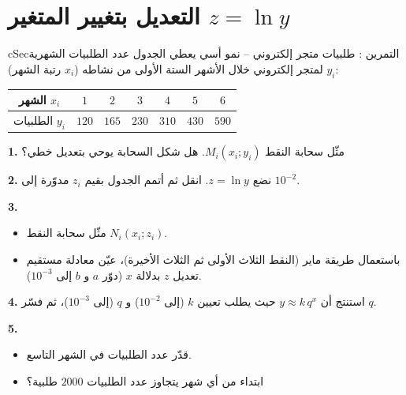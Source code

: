 \documentclass[12pt,a4paper]{article}
\newenvironment{BOX}[2]{\begin{otherlanguage}{english}\begin{arbox}{#1}{#2}}{\end{arbox}\end{otherlanguage}}
\newcounter{exo}
\newenvironment{tamrin}[1]{\stepcounter{exo}\begin{BOX}{cSec}{التمرين \theexo: #1}}{\end{BOX}}
\newenvironment{LTR}{\begin{otherlanguage}{english}}{\end{otherlanguage}}
\newcommand{\ar}[1]{\foreignlanguage{arabic}{#1}}
\newenvironment{sq}{\begin{itemize}[leftmargin=2.4em,itemsep=3pt]}{\end{itemize}}
\newcommand{\qa}{\item[(أ)]}\newcommand{\qb}{\item[(ب)]}\newcommand{\qc}{\item[(جـ)]}\newcommand{\qd}{\item[(د)]}\newcommand{\qe}{\item[(هـ)]}
\newcommand{\QQ}[1]{\par\smallskip\textbf{#1.} }
\begin{document}
\section{التعديل بتغيير المتغير $z=\ln y$}
\begin{tamrin}{طلبيات متجر إلكتروني -- نمو أسي}
يعطي الجدول عدد الطلبيات الشهرية $y_i$ لمتجر إلكتروني خلال الأشهر الستة الأولى من نشاطه ($x_i$ رتبة الشهر):
\begin{center}\begin{LTR}\renewcommand{\arraystretch}{1.35}\small
\begin{tabular}{|c|c|c|c|c|c|c|}\hline
\rowcolor{cSec!12}\ar{الشهر} $x_i$ & $1$ & $2$ & $3$ & $4$ & $5$ & $6$\\\hline
\ar{الطلبيات} $y_i$ & $120$ & $165$ & $230$ & $310$ & $430$ & $590$\\\hline
\end{tabular}\end{LTR}\end{center}
\QQ{1} مثّل سحابة النقط $M_i(x_i;y_i)$. هل شكل السحابة يوحي بتعديل خطي؟
\QQ{2} نضع $z=\ln y$. انقل ثم أتمم الجدول بقيم $z_i$ مدوّرة إلى $10^{-2}$.
\QQ{3}
\begin{sq}
\qa مثّل سحابة النقط $N_i(x_i;z_i)$.
\qb باستعمال طريقة ماير (النقط الثلاث الأولى ثم الثلاث الأخيرة)، عيّن معادلة مستقيم تعديل $z$ بدلالة $x$ (دوّر $a$ و $b$ إلى $10^{-3}$).
\end{sq}
\QQ{4} استنتج أن $y\approx k\,q^{x}$ حيث يطلب تعيين $k$ (إلى $10^{-2}$) و $q$ (إلى $10^{-3}$)، ثم فسّر $q$.
\QQ{5}
\begin{sq}
\qa قدّر عدد الطلبيات في الشهر التاسع.
\qb ابتداء من أي شهر يتجاوز عدد الطلبيات $2000$ طلبية؟
\end{sq}
\end{tamrin}
\end{document}
